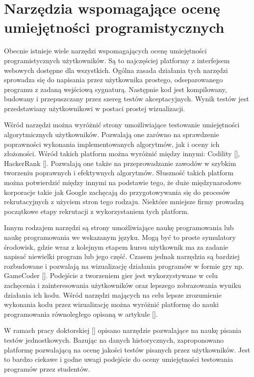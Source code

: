\section{Narzędzia wspomagające ocenę umiejętności programistycznych}

Obecnie istnieje wiele narzędzi wspomagających ocenę umiejętności programistycznych użytkowników.
Są to najczęściej platformy z interfejsem webowych dostępne dla wszystkich.
Ogólna zasada działania tych narzędzi sprowadza się do napisania przez użytkownika prostego, odseparowanego programu z zadaną wejściową sygnaturą.
Następnie kod jest kompilowany, budowany i przepuszczany przez szereg testów akceptacyjnych.
Wynik testów jest przedstawiany użytkownikowi w postaci prostej wizualizacji.

Wśród narzędzi można wyróżnić strony umożliwiające testowanie umiejętności algorytmicznych użytkowników.
Pozwalają one zarówno na sprawdzenie poprawności wykonania implementowanych algorytmów, jak i oceny ich złożoności.
Wśród takich platform można wyróżnić między innymi: Codility [], HackerRank []. 
Pozwalają one także na przeprowadzanie zawodów w szybkim tworzeniu poprawnych i efektywnych algorytmów. 
Słuszność takich platform można potwierdzić między innymi na podstawie tego, że duże międzynarodowe korporacje takie jak Google zachęcają do przygotowywania się do procesów rekrutacyjnych z użyciem stron tego rodzaju. 
Niektóre mniejsze firmy prowadzą początkowe etapy rekrutacji z wykorzystaniem tych platform.

Innym rodzajem narzędzi są strony umożliwiające naukę programowania lub naukę programowania we wskazanym języku. 
Mogą być to proste symulatory środowisk, gdzie wraz z kolejnym etapem kursu użytkownik ma za zadanie napisać niewielki program lub jego część.
Czasem jednak narzędzia są bardziej rozbudowane i pozwalają na wizualizację działania programów w formie gry np. GameCoder [].
Podejście z tworzeniem gier jest wykorzystywane w celu zachęcenia i zainteresowania użytkowników oraz lepszego zobrazowania wyniku działania ich kodu.
Wśród narzędzi mających na celu lepsze zrozumienie wykonania kodu przez wizualizację można wyróżnić platformę do nauki programowania równoległego opisaną w artykule [].

W ramach pracy doktorskiej [] opisano narzędzie pozwalające na naukę pisania testów jednostkowych.
Bazując na danych historycznych, zaproponowano platformę pozwalającą na ocenę jakości testów pisanych przez użytkowników.
Jest to bardzo ciekawe i godne uwagi podejście do oceny umiejętności testowania programów przez studentów.

